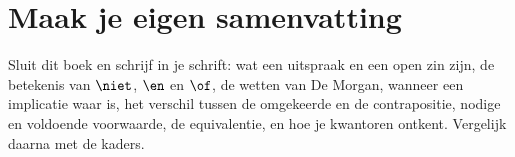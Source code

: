 \begin{oefeningen}






\end{oefeningen}


\ifzelfstudie
\section*{Maak je eigen samenvatting}
Sluit dit boek en schrijf in je schrift: wat een uitspraak en een open zin zijn, de betekenis van $\niet$, $\en$ en $\of$, de wetten van De Morgan, wanneer een implicatie waar is, het verschil tussen de omgekeerde en de contrapositie, nodige en voldoende voorwaarde, de equivalentie, en hoe je kwantoren ontkent. Vergelijk daarna met de kaders.
\fi
